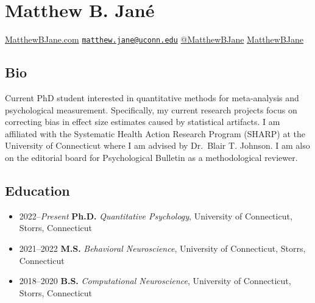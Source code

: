 \documentclass[
  letterpaper,
  DIV=11,
  numbers=noendperiod]{scrartcl}
\author{}
\date{}
\providecommand{\tightlist}{%
  \setlength{\itemsep}{0pt}\setlength{\parskip}{0pt}}\usepackage{longtable,booktabs,array}
\begin{document}
\ifdefined\Shaded\renewenvironment{Shaded}{\begin{tcolorbox}[frame hidden, interior hidden, borderline west={3pt}{0pt}{shadecolor}, boxrule=0pt, enhanced, breakable, sharp corners]}{\end{tcolorbox}}\fi

\hypertarget{matthew-b.-januxe9}{%
\section{Matthew B. Jané}\label{matthew-b.-januxe9}}

 \href{https://www.matthewbjane.com}{MatthewBJane.com}
\textbar{} 
\href{mailto:matthew.jane@uconn.edu}{\nolinkurl{matthew.jane@uconn.edu}}
\textbar{} 
\href{https://www.twitter.com/MatthewBJane}{@MatthewBJane} \textbar{}
 \href{https://www.github.io/MatthewBJane}{MatthewBJane}

\hypertarget{bio}{%
\subsection{Bio}\label{bio}}

Current PhD student interested in quantitative methods for meta-analysis
and psychological measurement. Specifically, my current research
projects focus on correcting bias in effect size estimates caused by
statistical artifacts. I am affiliated with the Systematic Health Action
Research Program (SHARP) at the University of Connecticut where I am
advised by Dr.~Blair T. Johnson. I am also on the editorial board for
Psychological Bulletin as a methodological reviewer.

\hypertarget{education}{%
\subsection{Education}\label{education}}

\begin{itemize}
\tightlist
\item
  2022--\emph{Present} \textbar{} \textbf{Ph.D.} \emph{Quantitative
  Psychology}, University of Connecticut, Storrs, Connecticut
\item
  2021--2022 \textbar{} \textbf{M.S.} \emph{Behavioral Neuroscience},
  University of Connecticut, Storrs, Connecticut
\item
  2018--2020 \textbar{} \textbf{B.S.} \emph{Computational Neuroscience},
  University of Connecticut, Storrs, Connecticut
\end{itemize}
\end{document}
